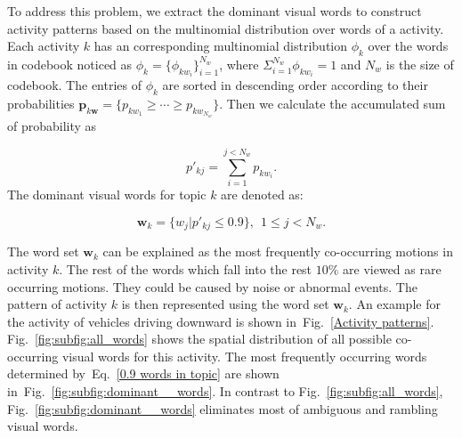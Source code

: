To address this problem, we extract the dominant visual words to construct activity patterns based on the multinomial distribution over words of a activity.
Each activity $k$ has an corresponding multinomial distribution $\phi_k$ over the words in codebook noticed as $\phi_k = \{\phi_{kw_i}\}_{i=1}^{N_w}$, where $\Sigma_{i=1}^{N_w} \phi_{kw_i}=1$
and $N_w$ is the size of codebook.
The entries of $\phi_k$ are sorted in descending order according to their probabilities $\mathbf{p}_{k\mathbf{w}} = \{p_{kw_1}\geq\cdots\geq p_{kw_{N_w}}\}$. Then we calculate the accumulated sum of probability as

\begin{equation}
	p'_{kj} = \sum_{i=1}^{j<N_w} p_{kw_i}.
	\label{aaccumulated_sum}
\end{equation}
The dominant visual words for topic $k$ are denoted as:

\begin{equation}
	\mathbf{w}_k= \{w_j|p'_{kj}\leq 0.9 \},~~1\leq j<N_w .
	\label{0.9 words in topic}
\end{equation}

The word set $\mathbf{w}_k$ can be explained as the most frequently co-occurring motions in activity $k$. 
The rest of the words which fall into the rest $10\%$ are viewed as rare occurring motions. They could be caused by noise or abnormal events. 
The pattern of activity $k$ is then represented using the word set $\mathbf{w}_k$. 
An example for the activity of vehicles driving downward is shown in~Fig.~\ref{Activity patterns}.
Fig.~\ref{fig:subfig:all_words} shows the spatial distribution of all possible co-occurring visual words for this activity. The most frequently occurring words determined by~Eq.~\eqref{0.9 words in topic} are shown in~Fig.~\ref{fig:subfig:dominant__words}.
In contrast to Fig.~\ref{fig:subfig:all_words}, Fig.~\ref{fig:subfig:dominant__words} eliminates most of ambiguous and rambling visual words. 


